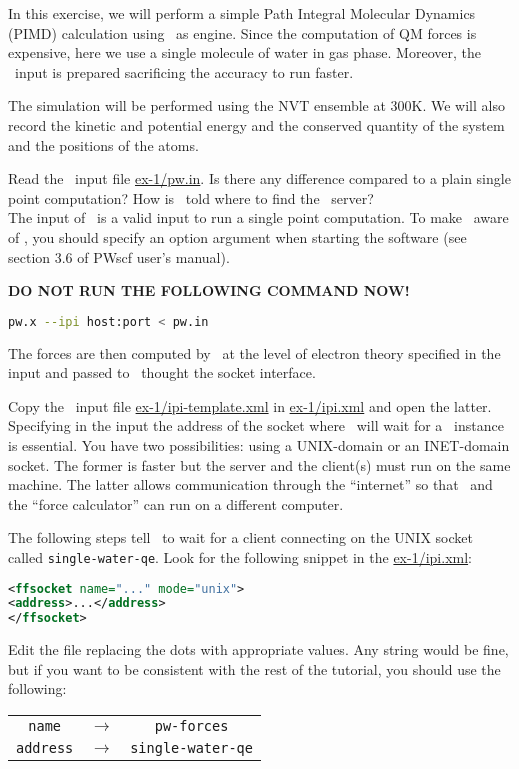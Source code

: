 \documentclass{article}
\begin{document}
\begin{Exercise}[label={i-pi},title={PIMD: a client/server approach}]

In this exercise, we will perform a simple Path Integral Molecular
Dynamics (PIMD) 
calculation using \PWscf\ as engine. Since the computation of QM forces is
expensive, here we use a single molecule of water in gas phase. Moreover, the
\PWscf\ input is prepared sacrificing the accuracy to run faster.

The simulation will be performed using the NVT ensemble at 300K.  We
will also record the kinetic and potential energy and the conserved
quantity of the system and the positions of the atoms.

\Question
Read the \PWscf\ input file \url{ex-1/pw.in}.
Is there any difference compared to a plain single point computation?
How is \pwx\ told where to find the \ipi\ server?\\

The input of \pwx\ is a valid input to run a single point
computation. To make \pwx\ aware of \ipi, you should specify an option argument
when starting the software (see section 3.6 of PWscf user's
manual).\newline

\vspace{1em}
\textbf{DO NOT RUN THE FOLLOWING COMMAND NOW!}
\vspace{1em}
\begin{lstlisting}[language=bash]
pw.x --ipi host:port < pw.in
\end{lstlisting}
The forces are then computed by \pwx\ at the level of electron theory
specified in the input and passed to \ipi\ thought the socket
interface.

\Question
Copy the \ipi\ input file \url{ex-1/ipi-template.xml} in
\url{ex-1/ipi.xml} and open the latter. Specifying in 
the input the address of the socket where \ipi\ will wait for a \pwx\
instance is essential. You have two possibilities: using a UNIX-domain
or an INET-domain socket. The former is faster but the server and the
client(s) must run on the same machine. The latter allows communication
through the ``internet'' so that \ipi\ and the ``force
calculator'' can run on a different computer.

The following steps tell \ipi\ to wait for a client connecting on the UNIX
socket called \texttt{single-water-qe}. Look for the following snippet
in the \url{ex-1/ipi.xml}:
\begin{lstlisting}[language=xml]
<ffsocket name="..." mode="unix">
<address>...</address>
</ffsocket>
\end{lstlisting}
Edit the file replacing the dots with appropriate values. Any string
would be fine, but if you
want to be consistent with the rest of the tutorial, you should use
the following:
\begin{table}[h!]
  \centering
  \begin{tabular}{ccc}
    \texttt{name} & $\longrightarrow$ & \texttt{pw-forces}\\
    \texttt{address} & $\longrightarrow$ & \texttt{single-water-qe}
  \end{tabular}
\end{table}



\end{Exercise}
\end{document}
